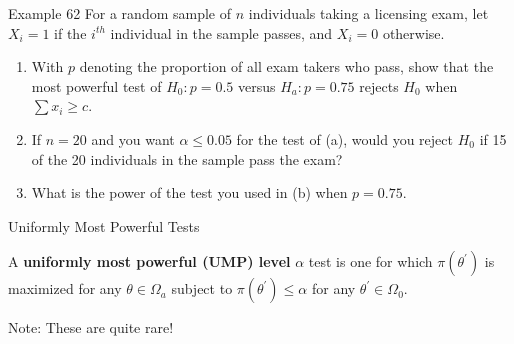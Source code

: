 \documentclass[
  ignorenonframetext,
]{beamer}
\providecommand{\tightlist}{%
  \setlength{\itemsep}{0pt}\setlength{\parskip}{0pt}}\usepackage{longtable,booktabs,array}
\begin{document}
\begin{frame}{Example 62}
\protect\hypertarget{example-62}{}
For a random sample of \(n\) individuals taking a licensing exam, let
\(X_{i} = 1\) if the \(i^{th}\) individual in the sample passes, and
\(X_{i} = 0\) otherwise.

\begin{enumerate}[<+->]
[a.]
\tightlist
\item
  With \(p\) denoting the proportion of all exam takers who pass, show
  that the most powerful test of \(H_{0}: p = 0.5\) versus
  \(H_{a}: p = 0.75\) rejects \(H_{0}\) when \(\sum x_{i} \geq c\).
\item
  If \(n=20\) and you want \(\alpha \leq 0.05\) for the test of (a),
  would you reject \(H_{0}\) if 15 of the 20 individuals in the sample
  pass the exam?
\item
  What is the power of the test you used in (b) when \(p=0.75\).
\end{enumerate}
\end{frame}

\begin{frame}{Uniformly Most Powerful Tests}
\protect\hypertarget{uniformly-most-powerful-tests}{}
\begin{tcolorbox}[enhanced jigsaw, left=2mm, breakable, bottomrule=.15mm, colframe=quarto-callout-important-color-frame, arc=.35mm, leftrule=.75mm, colbacktitle=quarto-callout-important-color!10!white, titlerule=0mm, opacityback=0, coltitle=black, opacitybacktitle=0.6, colback=white, toprule=.15mm, toptitle=1mm, bottomtitle=1mm, title=\textcolor{quarto-callout-important-color}{\faExclamation}\hspace{0.5em}{Definition}, rightrule=.15mm]

A \textbf{uniformly most powerful (UMP) level} \(\alpha\) test is one
for which \(\pi(\theta^{\prime})\) is maximized for any
\(\theta \in \Omega_{a}\) subject to
\(\pi(\theta^{\prime}) \leq \alpha\) for any
\(\theta^{\prime} \in \Omega_{0}\).

Note: These are quite rare!

\end{tcolorbox}
\end{frame}
\end{document}

